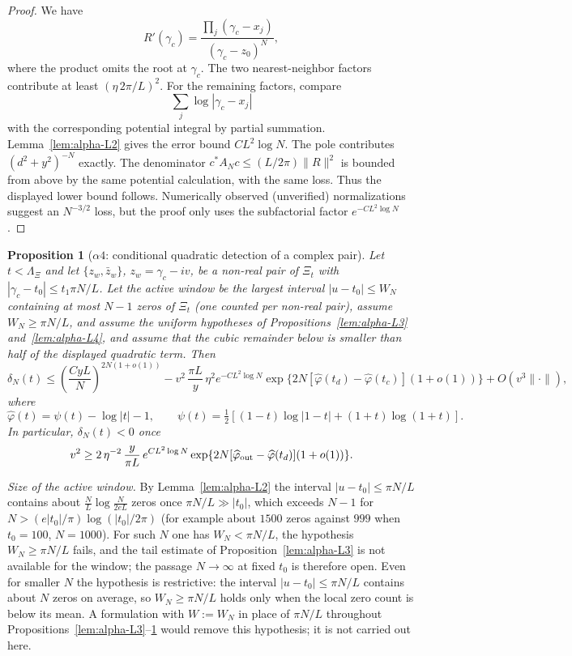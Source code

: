 \documentclass[11pt]{amsart}
\newtheorem{proposition}[theorem]{Proposition}
\theoremstyle{definition}
\theoremstyle{remark}
\theoremstyle{definition}
\begin{document}
\begin{proof}
We have
\[
   R'(\gamma_c)=\frac{\prod_j(\gamma_c-x_j)}{(\gamma_c-z_0)^N},
\]
where the product omits the root at $\gamma_c$.  The two nearest-neighbor factors contribute at least
$(\eta\,2\pi/L)^2$.  For the remaining factors, compare
\[
   \sum_j\log|\gamma_c-x_j|
\]
with the corresponding potential integral by partial summation.  Lemma~\ref{lem:alpha-L2} gives the
error bound $C L^2\log N$.  The pole contributes $(d^2+y^2)^{-N}$ exactly.  The denominator
$c^*A_Nc\le (L/2\pi)\|R\|^2$ is bounded from above by the same potential calculation, with the same
loss.  Thus the displayed lower bound follows.  Numerically observed (unverified) normalizations suggest
an $N^{-3/2}$ loss, but the proof only uses the subfactorial factor $e^{-C L^2\log N}$.
\end{proof}

\begin{proposition}[$\alpha4$: conditional quadratic detection of a complex pair]\label{thm:alpha4}
Let $t<\Lambda_\Xi$ and let $\{z_w,\bar z_w\}$, $z_w=\gamma_c-iv$, be a non-real pair of
$\Xi_t$ with $|\gamma_c-t_0|\le t_1\pi N/L$.  Let the active window be the largest interval
$|u-t_0|\le W_N$ containing at most $N-1$ zeros of $\Xi_t$ (one counted per non-real pair), assume
$W_N\ge\pi N/L$, and assume the uniform hypotheses of
Propositions~\ref{lem:alpha-L3} and~\ref{lem:alpha-L4}, and assume that the cubic remainder below is
smaller than half of the displayed quadratic term.  Then
\[
   \delta_N(t)
   \le
   \left(\frac{C yL}{N}\right)^{2N(1+o(1))}
   -
   v^2\,\frac{\pi L}{y}\,\eta^2e^{-C L^2\log N}
   \exp\{2N[\widehat\varphi(t_d)-\widehat\varphi(t_c)](1+o(1))\}
   +O(v^3\|\cdot\|),
\]
where
\[
   \widehat\varphi(t)=\psi(t)-\log|t|-1,\qquad
   \psi(t)=\tfrac12[(1-t)\log|1-t|+(1+t)\log(1+t)].
\]
In particular, $\delta_N(t)<0$ once
\[
   v^2\ge 2\,\eta^{-2}\,\frac{y}{\pi L}\,e^{C L^2\log N}
   \exp\{2N[\widehat\varphi_{\rm out}-\widehat\varphi(t_d)](1+o(1))\}.
\]
\end{proposition}

\noindent\emph{Size of the active window.}
By Lemma~\ref{lem:alpha-L2} the interval $|u-t_0|\le\pi N/L$ contains about
$\tfrac NL\log\tfrac N{2eL}$ zeros once $\pi N/L\gg|t_0|$, which exceeds $N-1$ for
$N>(e|t_0|/\pi)\log(|t_0|/2\pi)$ (for example about $1500$ zeros against $999$ when $t_0=100$,
$N=1000$).  For such $N$ one has $W_N<\pi N/L$, the hypothesis $W_N\ge\pi N/L$ fails, and the tail
estimate of Proposition~\ref{lem:alpha-L3} is not available for the window; the passage $N\to\infty$ at
fixed $t_0$ is therefore open.  Even for smaller $N$ the hypothesis is restrictive: the interval
$|u-t_0|\le\pi N/L$ contains about $N$ zeros on average, so $W_N\ge\pi N/L$ holds only when the local
zero count is below its mean.  A formulation with $W:=W_N$ in place of $\pi N/L$ throughout
Propositions~\ref{lem:alpha-L3}--\ref{thm:alpha4} would remove this hypothesis; it is not carried out
here.
\end{document}
